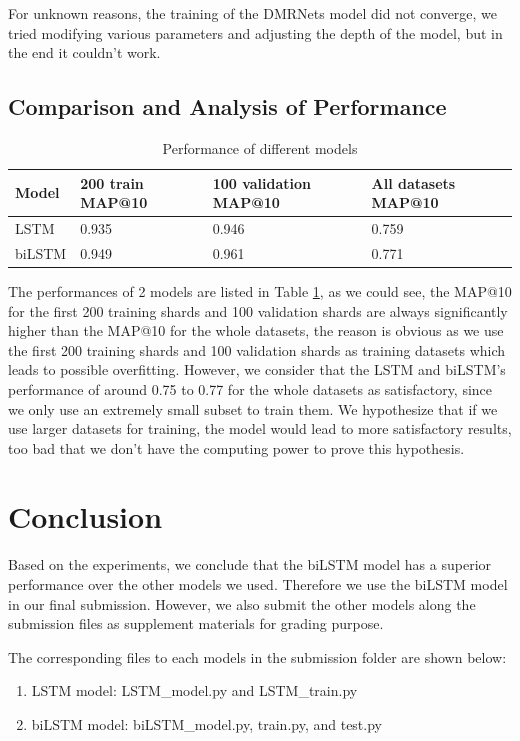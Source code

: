 \documentclass{article}
\begin{document}
For unknown reasons, the training of the DMRNets model did not converge, we tried modifying various parameters and adjusting the depth of the model, but in the end it couldn't work.

\subsection{Comparison and Analysis of Performance}
\begin{table} [H]
  \caption{Performance of different models}
  \label{table 1}
  \centering
  \begin{tabular}{llll}
    \toprule
    Model     & 200 train MAP@10     & 100 validation MAP@10 & All datasets MAP@10 \\
    \midrule 
LSTM & 0.935  & 0.946 & 0.759     \\
biLSTM     & 0.949 & 0.961 & 0.771      \\
    \bottomrule
  \end{tabular}
\end{table}
The performances of 2 models are listed in Table \ref{table 1}, as we could see, the MAP@10 for the first 200 training shards and 100 validation shards are always significantly higher than the MAP@10 for the whole datasets, the reason is obvious as we use the first 200 training shards and 100 validation shards as training datasets which leads to possible overfitting. However, we consider that the LSTM and biLSTM's performance of around 0.75 to 0.77 for the whole datasets as satisfactory, since we only use an extremely small subset to train them. We hypothesize that if we use larger datasets for training, the model would lead to more satisfactory results, too bad that we don't have the computing power to prove this hypothesis.

\section{Conclusion}
Based on the experiments, we conclude that the biLSTM model has a superior performance over the other models we used. Therefore we use the biLSTM model in our final submission. However, we also submit the other models along the submission files as supplement materials for grading purpose.

The corresponding files to each models in the submission folder are shown below:
\begin{enumerate}
\item LSTM model: LSTM\_model.py and LSTM\_train.py
\item biLSTM model: biLSTM\_model.py, train.py, and test.py
\end{enumerate}
\end{document}
